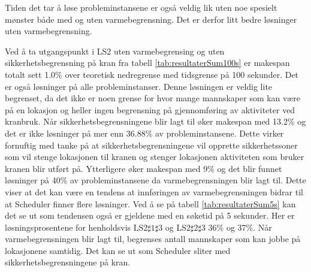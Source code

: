 Tiden det tar å løse probleminstansene er også veldig lik uten noe spesielt mønster både med og uten varmebegrensning. Det er derfor litt bedre løsninger uten varmebegrensning.

Ved å ta utgangspunkt i LS2 uten varmebegrensing og uten sikkerhetsbegrensning på kran fra tabell \ref{tab:resultaterSum100s} er makespan totalt sett 1.0\% over teoretisk nedregrense med tidsgrense på 100 sekunder. Det er også løsninger på alle probleminstanser. Denne løsningen er veldig lite begrenset, da det ikke er noen grense for hvor mange mannskaper som kan være på en lokasjon og heller ingen begrensning på gjennomføring av aktiviteter ved kranbruk. Når sikkerhetsbegrensningene blir lagt til øker makespan med 13.2\% og det er ikke løsninger på mer enn 36.88\% av probleminstansene. Dette virker fornuftig med tanke på at sikkerhetsbegrensningene vil opprette sikkerhetssoner som vil stenge lokasjonen til kranen og stenger lokasjonen aktiviteten som bruker kranen blir utført på. Ytterligere øker makespan med 9\% og det blir funnet løsninger på 40\% av probleminstansene da varmebegrensningen blir lagt til. Dette viser at det kan være en tendens at innføringen av varmebegrensningen bidrar til at Scheduler finner flere løsninger. Ved å se på tabell \ref{tab:resultaterSum5s} kan det se ut som tendensen også er gjeldene med en søketid på 5 sekunder. Her er løsningsprosentene for henholdsvis LS2$\sharp 1\sharp3$ og LS2$\sharp 2\sharp3$ 36\% og 37\%. Når varmebegrensningen blir lagt til, begrenses antall mannskaper som kan jobbe på lokasjonene samtidig. Det kan se ut som Scheduler sliter med sikkerhetsbegrensningene på kran.

